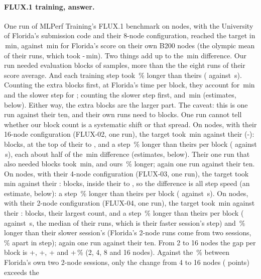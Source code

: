 \paragraph{FLUX.1 training, answer.} One run of MLPerf Training's FLUX.1 benchmark on \TriFxNodes{} nodes, with the University of Florida's submission code and their 8-node configuration, reached the target in \TriFxTtt\,min, against \TriFxFlTtt\,min for Florida's score on their own B200 nodes (the olympic mean of their \TriFxFlRuns{} runs, which took \TriFxFlTttLo-\TriFxFlTttHi\,min). Two things add up to the \TriFxDiff\,min difference. Our run needed \TriFxBlocks{} evaluation blocks of \TriFxBlockSamples{} samples, \TriFxBlocksMore{} more than the \TriFxFlBlocksMean{} the eight runs of their score average. And each training step took \TriFxStepPct\,\% longer than theirs (\TriFxStep{} against \TriFxFlStep\,s). Counting the extra blocks first, at Florida's time per block, they account for \TriFxSplitBlocks\,min and the slower step for \TriFxSplitSpeed; counting the slower step first, \TriFxSplitSpeedFirst{} and \TriFxSplitBlocksSecond\,min (estimates, below). Either way, the extra blocks are the larger part. The caveat: this is one run against their ten, and their own runs need \TriFxFlBlocksLo{} to \TriFxFlBlocksHi{} blocks. One run cannot tell whether our block count is a systematic shift or that spread. On \TriFxSixteenNodes{} nodes, with their 16-node configuration (FLUX-02, one run), the target took \TriFxSixteenTtt\,min against their \TriFxSixteenFlTtt{} (\TriFxSixteenFlTttLo-\TriFxSixteenFlTttHi): \TriFxSixteenBlocks{} blocks, at the top of their \TriFxSixteenFlBlocksLo{} to \TriFxSixteenFlBlocksHi, and a step \TriFxSixteenStepPct\,\% longer than theirs per block (\TriFxSixteenStep{} against \TriFxSixteenFlStep\,s), each about half of the \TriFxSixteenDiff\,min difference (estimates, below). Their one run that also needed \TriFxSixteenBlocks{} blocks took \TriFxSixteenFlSame\,min, and ours \TriFxSixteenAboveSame\,\% longer; again one run against their ten. On \TriFxFourNodes{} nodes, with their 4-node configuration (FLUX-03, one run), the target took \TriFxFourTtt\,min against their \TriFxFourFlTtt: \TriFxFourBlocks{} blocks, inside their \TriFxFourFlBlocksLo{} to \TriFxFourFlBlocksHi, so the difference is all step speed (an estimate, below): a step \TriFxFourStepPct\,\% longer than theirs per block (\TriFxFourStep{} against \TriFxFourFlStep\,s). On \TriFxTwoNodes{} nodes, with their 2-node configuration (FLUX-04, one run), the target took \TriFxTwoTtt\,min against their \TriFxTwoFlTtt: \TriFxTwoBlocks{} blocks, their largest count, and a step \TriFxTwoStepPct\,\% longer than theirs per block (\TriFxTwoStep{} against \TriFxTwoFlStep\,s, the median of their runs, which is their faster session's step) and \TriFxTwoStepPctSlow\,\% longer than their slower session's (Florida's 2-node runs come from two sessions, \TriFxScaleFlSessionPct\,\% apart in step); again one run against their ten. From 2 to 16 nodes the gap per block is +\TriFxTwoStepPct, +\TriFxFourStepPct, +\TriFxStepPct{} and +\TriFxSixteenStepPct\,\% (2, 4, 8 and 16 nodes). Against the \TriFxScaleFlSessionPct\,\% between Florida's own two 2-node sessions, only the change from 4 to 16 nodes (\TriFxScaleNarrow{} points) exceeds the 